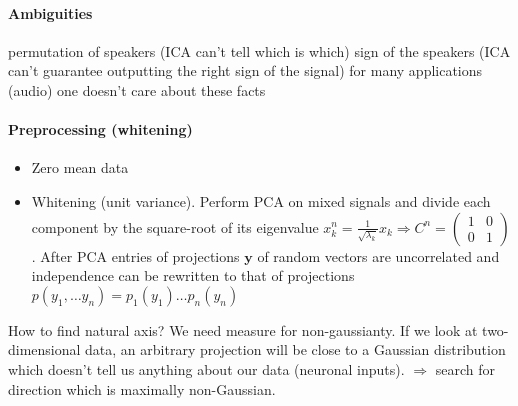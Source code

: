 \documentclass[11pt]{article}
\begin{document}
\paragraph{Ambiguities}
permutation of speakers (ICA can't tell which is which)
sign of the speakers (ICA can't guarantee outputting the right sign of the signal)
for many applications (audio) one doesn't care about these facts

\paragraph{Preprocessing (whitening)} \begin{itemize}
\item Zero mean data
\item Whitening (unit variance). Perform PCA on mixed signals and divide each component by the square-root of its eigenvalue $x_k^n=\frac{1}{\sqrt{\lambda_k}}x_k \Rightarrow C^n=\begin{pmatrix}1 & 0 \\ 0 & 1\end{pmatrix}$. After PCA entries of projections $\mathbf{y}$ of random vectors are uncorrelated and independence can be rewritten to that of projections $p(y_1,\dots y_n)=p_1(y_1)\dots p_n(y_n)$
\end{itemize}
How to find natural axis? We need measure for non-gaussianty.
If we look at two-dimensional data, an arbitrary projection will be close to a Gaussian distribution which doesn't tell us anything about our data (neuronal inputs). $\Rightarrow$ search for direction which is maximally non-Gaussian.\\
\end{document}
